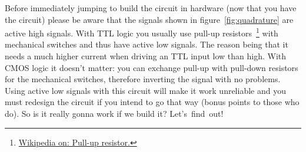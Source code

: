 \documentclass[a4paper]{article}
\begin{document}
Before immediately jumping to build the circuit in hardware (now that you have the circuit) please be aware that the signals shown in figure~\ref{fig:quadrature} are active high signals.
With TTL logic you usually use pull-up resistors~\footnote{\href{https://en.wikipedia.org/wiki/Pull-up_resistor}{Wikipedia on: Pull-up resistor.}} with mechanical switches and thus have active low signals.
The reason being that it needs a much higher current when driving an TTL input low than high.
With CMOS logic it doesn't matter: you can exchange pull-up with pull-down resistors for the mechanical switches, therefore inverting the signal with no problems.
Using active low signals with this circuit will make it work unreliable and you must redesign the circuit if you intend to go that way (bonus points to those who do).
So is it really gonna work if we build it? Let's~find~out!
\newpage
\end{document}
